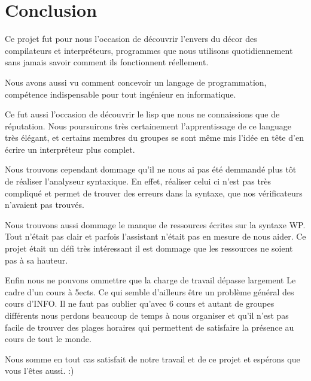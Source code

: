 \section{Conclusion}
	Ce projet fut pour nous l'occasion de découvrir l'envers
	du décor des compilateurs et interpréteurs, programmes que nous
	utilisons quotidiennement sans jamais savoir comment ils fonctionnent réellement.

	Nous avons aussi vu comment concevoir un langage de programmation, compétence
	indispensable pour tout ingénieur en informatique. 

	Ce fut aussi l'occasion de découvrir le lisp que nous ne connaissions
	que de réputation. Nous poursuirons très certainement l'apprentissage
	de ce language très élégant, et certains membres du groupes se sont
	même mis l'idée en tête d'en écrire un interpréteur plus complet. 

	Nous trouvons cependant dommage qu'il ne nous ai pas été demmandé plus
	tôt de réaliser l'analyseur syntaxique. En effet, réaliser celui ci
	n'est pas très compliqué et permet de trouver des erreurs dans la syntaxe,
	que nos vérificateurs n'avaient pas trouvés. 

	Nous trouvons aussi dommage le manque de ressources écrites sur la syntaxe
	WP. Tout n'était pas clair et parfois l'assistant n'était pas en mesure de
	nous aider. Ce projet était un défi très intéressant il est dommage que 
	les ressources ne soient pas à sa hauteur. 

	Enfin nous ne pouvons ommettre que la charge de travail dépasse largement
	Le cadre d'un cours à 5ects. Ce qui semble d'ailleurs être un problème 
	général des cours d'INFO. Il ne faut pas oublier qu'avec 6 cours et autant
	de groupes différents nous perdons beaucoup de temps à nous organiser et
	qu'il n'est pas facile de trouver des plages horaires qui permettent de
	satisfaire la présence au cours de tout le monde. 

	Nous somme en tout cas satisfait de notre travail et de ce projet et 
	espérons que vous l'êtes aussi. :) 



	


